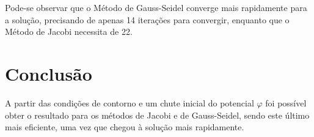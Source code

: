 \documentclass[a4paper,12pt]{article}
\begin{document}
Pode-se observar que o Método de Gauss-Seidel converge mais rapidamente para a solução, precisando de apenas 14 iterações para convergir, enquanto que o Método de Jacobi necessita de 22.


\section{Conclusão}

A partir das condições de contorno e um chute inicial do potencial $\varphi$ foi possível obter o resultado para os métodos de Jacobi e de Gauss-Seidel, sendo este último mais eficiente, uma vez que chegou à solução mais rapidamente.

\nocite{*}


\end{document}
